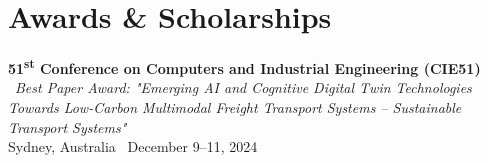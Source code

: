 \documentclass[10pt, letterpaper]{article}
\begin{document}









        \section*{\small Awards \& Scholarships}

        \noindent \textbf{51\textsuperscript{st} Conference on Computers and Industrial Engineering (CIE51)} \ \textit{Best Paper Award: "Emerging AI and Cognitive Digital Twin Technologies Towards Low-Carbon Multimodal Freight Transport Systems – Sustainable Transport Systems"} \\ Sydney, Australia \  December 9–11, 2024 \
        \vspace{0.3em}
\end{document}
